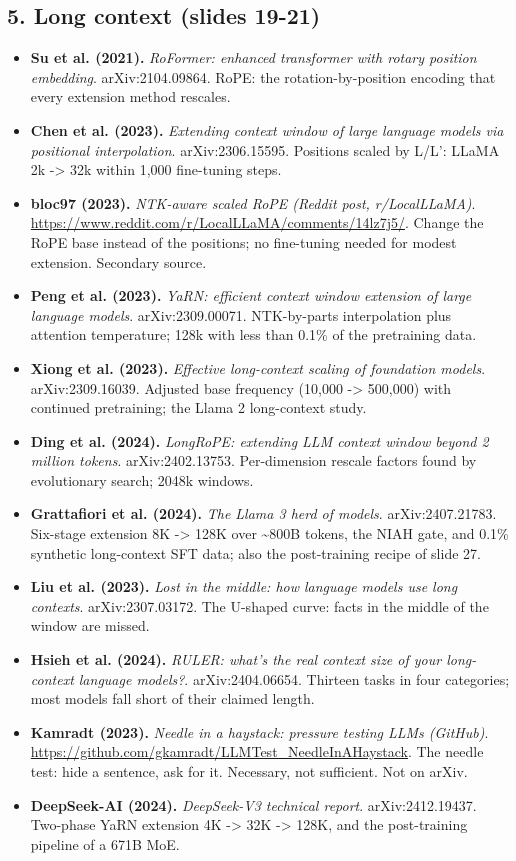 \documentclass[11pt,letterpaper]{article}
\begin{document}
\subsection*{5. Long context (slides 19-21)}
\begin{itemize}[leftmargin=1.2em,itemsep=3pt]\sloppy
\item \textbf{Su et al. (2021).} \textit{RoFormer: enhanced transformer with rotary position embedding}. arXiv:2104.09864. RoPE: the rotation-by-position encoding that every extension method rescales.
\item \textbf{Chen et al. (2023).} \textit{Extending context window of large language models via positional interpolation}. arXiv:2306.15595. Positions scaled by L/L': LLaMA 2k -> 32k within 1,000 fine-tuning steps.
\item \textbf{bloc97 (2023).} \textit{NTK-aware scaled RoPE (Reddit post, r/LocalLLaMA)}. \url{https://www.reddit.com/r/LocalLLaMA/comments/14lz7j5/}. Change the RoPE base instead of the positions; no fine-tuning needed for modest extension. Secondary source.
\item \textbf{Peng et al. (2023).} \textit{YaRN: efficient context window extension of large language models}. arXiv:2309.00071. NTK-by-parts interpolation plus attention temperature; 128k with less than 0.1\% of the pretraining data.
\item \textbf{Xiong et al. (2023).} \textit{Effective long-context scaling of foundation models}. arXiv:2309.16039. Adjusted base frequency (10,000 -> 500,000) with continued pretraining; the Llama 2 long-context study.
\item \textbf{Ding et al. (2024).} \textit{LongRoPE: extending LLM context window beyond 2 million tokens}. arXiv:2402.13753. Per-dimension rescale factors found by evolutionary search; 2048k windows.
\item \textbf{Grattafiori et al. (2024).} \textit{The Llama 3 herd of models}. arXiv:2407.21783. Six-stage extension 8K -> 128K over \~{}800B tokens, the NIAH gate, and 0.1\% synthetic long-context SFT data; also the post-training recipe of slide 27.
\item \textbf{Liu et al. (2023).} \textit{Lost in the middle: how language models use long contexts}. arXiv:2307.03172. The U-shaped curve: facts in the middle of the window are missed.
\item \textbf{Hsieh et al. (2024).} \textit{RULER: what's the real context size of your long-context language models?}. arXiv:2404.06654. Thirteen tasks in four categories; most models fall short of their claimed length.
\item \textbf{Kamradt (2023).} \textit{Needle in a haystack: pressure testing LLMs (GitHub)}. \url{https://github.com/gkamradt/LLMTest_NeedleInAHaystack}. The needle test: hide a sentence, ask for it. Necessary, not sufficient. Not on arXiv.
\item \textbf{DeepSeek-AI (2024).} \textit{DeepSeek-V3 technical report}. arXiv:2412.19437. Two-phase YaRN extension 4K -> 32K -> 128K, and the post-training pipeline of a 671B MoE.
\end{itemize}
\end{document}
